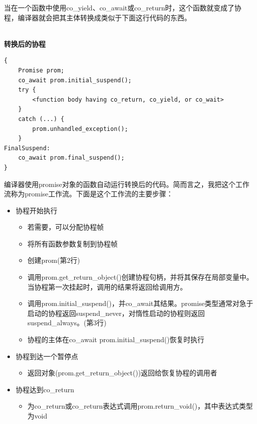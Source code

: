 当在一个函数中使用co\_yield、co\_await或co\_return时，这个函数就变成了协程，编译器就会把其主体转换成类似于下面这行代码的东西。

\hspace*{\fill} \\ %
\noindent
\textbf{转换后的协程}
\begin{lstlisting}[style=styleCXX]
{
	Promise prom;
	co_await prom.initial_suspend();
	try {
		<function body having co_return, co_yield, or co_wait>
	}
	catch (...) {
		prom.unhandled_exception();
	}
FinalSuspend:
	co_await prom.final_suspend();
}
\end{lstlisting}

编译器使用promise对象的函数自动运行转换后的代码。简而言之，我把这个工作流称为promise工作流。下面是这个工作流的主要步骤：

\begin{itemize}
\item 
协程开始执行

\begin{itemize}
\item 
若需要，可以分配协程帧

\item 
将所有函数参数复制到协程帧

\item 
创建prom(第2行)

\item 
调用prom.get\_return\_object()创建协程句柄，并将其保存在局部变量中。当协程第一次挂起时，调用的结果将返回给调用方。

\item 
调用prom.initial\_suspend()，并co\_await其结果。promise类型通常对急于启动的协程返回suspend\_never，对惰性启动的协程则返回suspend\_always。(第3行)

\item 
协程的主体在co\_await prom.initial\_suspend()恢复时执行
\end{itemize}

\item 
协程到达一个暂停点
\begin{itemize}
\item 
返回对象(prom.get\_return\_object())返回给恢复协程的调用者
\end{itemize}

\item 
协程达到co\_return
\begin{itemize}
\item 
为co\_return或co\_return表达式调用prom.return\_void()，其中表达式类型为void


\end{itemize}
\end{itemize}

